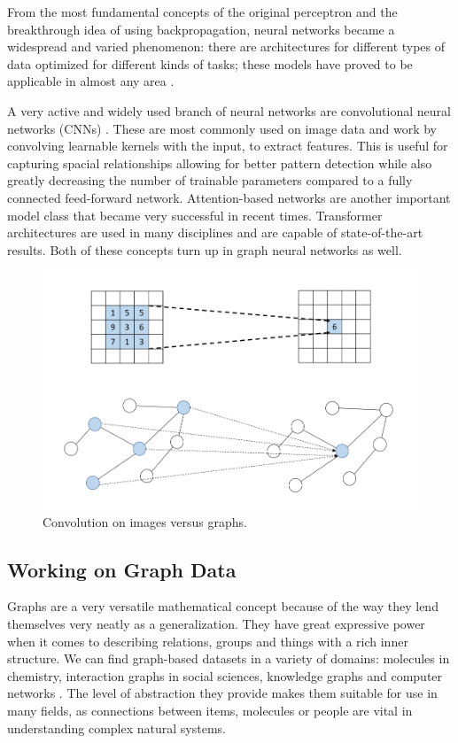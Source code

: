 	From the most fundamental concepts of the original perceptron and the breakthrough idea of using backpropagation, neural networks became a widespread and varied phenomenon: there are architectures for different types of data optimized for different kinds of tasks; these models have proved to be applicable in almost any area \cite{shrestha2019review}.
	
	A very active and widely used branch of neural networks are convolutional neural networks (CNNs) \cite{li2021survey}. These are most commonly used on image data and work by convolving learnable kernels with the input, to extract features. This is useful for capturing spacial relationships allowing for better pattern detection while also greatly decreasing the number of trainable parameters compared to a fully connected feed-forward network. Attention-based networks \cite{vaswani2017attention} are another important model class that became very successful in recent times. Transformer architectures are used in many disciplines and are capable of state-of-the-art results. Both of these concepts turn up in graph neural networks as well.
	
	\begin{figure}[!h]
		\centering
		\includegraphics[width=\textwidth]{figures/convolution.png}
		\caption{Convolution on images versus graphs.}
	\end{figure}
	
	\subsection{Working on Graph Data}
	
	Graphs are a very versatile mathematical concept because of the way they lend themselves very neatly as a generalization. They have great expressive power when it comes to describing relations, groups and things with a rich inner structure. We can find graph-based datasets in a variety of domains: molecules in chemistry, interaction graphs in social sciences, knowledge graphs and computer networks \cite{gnn_review}. The level of abstraction they provide makes them suitable for use in many fields, as connections between items, molecules or people are vital in understanding complex natural systems.
	
